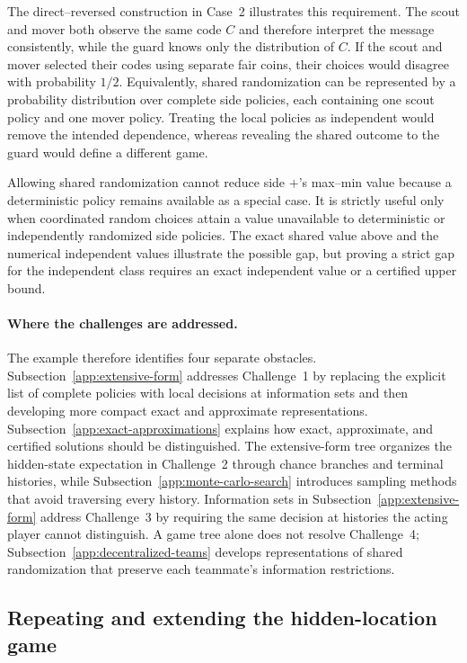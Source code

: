 The direct--reversed construction in Case~2 illustrates this requirement. The scout and mover both observe the same code $C$ and therefore interpret the message consistently, while the guard knows only the distribution of $C$. If the scout and mover selected their codes using separate fair coins, their choices would disagree with probability $1/2$. Equivalently, shared randomization can be represented by a probability distribution over complete side policies, each containing one scout policy and one mover policy. Treating the local policies as independent would remove the intended dependence, whereas revealing the shared outcome to the guard would define a different game.

Allowing shared randomization cannot reduce side $+$'s max--min value because a deterministic policy remains available as a special case. It is strictly useful only when coordinated random choices attain a value unavailable to deterministic or independently randomized side policies. The exact shared value above and the numerical independent values illustrate the possible gap, but proving a strict gap for the independent class requires an exact independent value or a certified upper bound.

\paragraph{Where the challenges are addressed.}
The example therefore identifies four separate obstacles. Subsection~\ref{app:extensive-form} addresses Challenge~1 by replacing the explicit list of complete policies with local decisions at information sets and then developing more compact exact and approximate representations. Subsection~\ref{app:exact-approximations} explains how exact, approximate, and certified solutions should be distinguished. The extensive-form tree organizes the hidden-state expectation in Challenge~2 through chance branches and terminal histories, while Subsection~\ref{app:monte-carlo-search} introduces sampling methods that avoid traversing every history. Information sets in Subsection~\ref{app:extensive-form} address Challenge~3 by requiring the same decision at histories the acting player cannot distinguish. A game tree alone does not resolve Challenge~4; Subsection~\ref{app:decentralized-teams} develops representations of shared randomization that preserve each teammate's information restrictions.

\subsection{Repeating and extending the hidden-location game}
\label{app:repeated-hidden-location}

